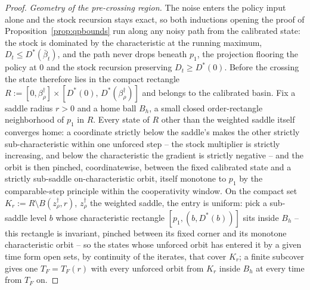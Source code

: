 \documentclass[11pt]{article}
\theoremstyle{definition}
\theoremstyle{remark}
\numberwithin{equation}{section}
\begin{document}
\begin{proof}
\emph{Geometry of the pre-crossing region.} The noise enters the policy input alone and the stock recursion stays exact, so both inductions opening the proof of Proposition~\ref{prop:qpbounds} run along any noisy path from the calibrated state: the stock is dominated by the characteristic at the running maximum, $D_t \le D^\ast(\bar\beta_t)$, and the path never drops beneath $p_1$, the projection flooring the policy at $0$ and the stock recursion preserving $D_t \ge D^\ast(0)$. Before the crossing the state therefore lies in the compact rectangle $R := [0,\beta^\dagger_\rho] \times [D^\ast(0),\, D^\ast(\beta^\dagger_\rho)]$ and belongs to the calibrated basin. Fix a saddle radius $r > 0$ and a home ball $B_h$, a small closed order-rectangle neighborhood of $p_1$ in $R$. Every state of $R$ other than the weighted saddle itself converges home: a coordinate strictly below the saddle's makes the other strictly sub-characteristic within one unforced step -- the stock multiplier is strictly increasing, and below the characteristic the gradient is strictly negative -- and the orbit is then pinched, coordinatewise, between the fixed calibrated state and a strictly sub-saddle on-characteristic orbit, itself monotone to $p_1$ by the comparable-step principle within the cooperativity window. On the compact set $K_r := R \setminus B(z^\dagger_\rho, r)$, $z^\dagger_\rho$ the weighted saddle, the entry is uniform: pick a sub-saddle level $b$ whose characteristic rectangle $[p_1, (b, D^\ast(b))]$ sits inside $B_h$ -- this rectangle is invariant, pinched between its fixed corner and its monotone characteristic orbit -- so the states whose unforced orbit has entered it by a given time form open sets, by continuity of the iterates, that cover $K_r$; a finite subcover gives one $T_F = T_F(r)$ with every unforced orbit from $K_r$ inside $B_h$ at every time from $T_F$ on.


\end{proof}
\end{document}
